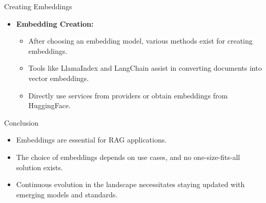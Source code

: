 \begin{frame}[fragile]{Creating Embeddings}
  \begin{itemize}
    \item \textbf{Embedding Creation:}
      \begin{itemize}
        \item After choosing an embedding model, various methods exist for creating embeddings.
        \item Tools like LlamaIndex and LangChain assist in converting documents into vector embeddings.
        \item Directly use services from providers or obtain embeddings from HuggingFace.
      \end{itemize}
  \end{itemize}
\end{frame}

\begin{frame}[fragile]{Conclusion}
  \begin{itemize}
    \item Embeddings are essential for RAG applications.
    \item The choice of embeddings depends on use cases, and no one-size-fits-all solution exists.
    \item Continuous evolution in the landscape necessitates staying updated with emerging models and standards.
  \end{itemize}
\end{frame}